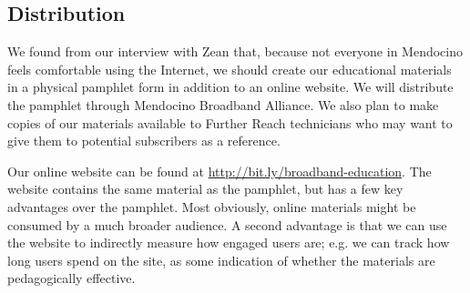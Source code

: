\subsection{Distribution}

We found from our interview with Zean that, because not everyone in Mendocino
feels comfortable using the Internet, we should create our educational
materials in a physical pamphlet form in addition to an online website. We
will distribute the pamphlet through Mendocino Broadband Alliance. We also
plan to make copies of our materials available to Further Reach technicians
who may want to give them to potential subscribers as a reference.

Our online website can be found at \url{http://bit.ly/broadband-education}. The website contains the same
material as the pamphlet, but has a few key advantages over the pamphlet.
Most obviously, online materials might be consumed by a much broader audience. A second
advantage is that we can use the website to indirectly measure how engaged users
are; e.g. we can track how long users spend on the site, as some indication of
whether the materials are pedagogically effective.

